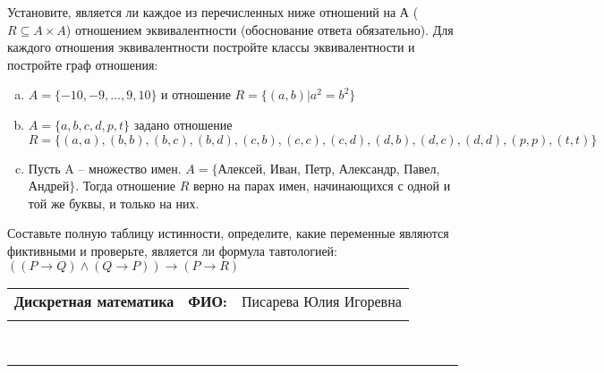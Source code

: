 \documentclass[10pt]{exam}
\newcommand{\class}{Дискретная математика}
\newcommand{\examdate}{}
\begin{document}
\begin{questions}
\question
Установите, является ли каждое из перечисленных ниже отношений на А ($R \subseteq A \times A$) отношением эквивалентности (обоснование ответа обязательно). Для каждого отношения эквивалентности постройте классы 
эквивалентности и постройте граф отношения:
\begin{enumerate} [a)]\setcounter{enumi}{0}
\item $A = \{-10, -9, … , 9, 10\}$ и отношение $R = \{(a,b)|a^{2} = b^{2}\}$
\item $A = \{a, b, c, d, p, t\}$ задано отношение $R = \{(a, a), (b, b), (b, c), (b, d), (c, b), (c, c), (c, d), (d, b), (d, c), (d, d), (p,p), (t,t)\}$
\item Пусть A – множество имен. $A = \{ $Алексей, Иван, Петр, Александр, Павел, Андрей$ \}$. Тогда отношение $R$ верно на парах имен, начинающихся с одной и той же буквы, и только на них.
\end{enumerate}\question Составьте полную таблицу истинности, определите, какие переменные являются фиктивными и проверьте, является ли формула тавтологией:
$(( P \rightarrow Q) \land (Q \rightarrow P)) \rightarrow (P \rightarrow R)$

\end{questions}
\newpage
\begin{flushright}
\begin{tabular}{p{2.8in} r l}
\textbf{\class} & \textbf{ФИО:} &Писарева Юлия Игоревна
\\

\textbf{\examdate} &&\\
\end{tabular}\\
\end{flushright}
\rule[1ex]{\textwidth}{.1pt}
\end{document}
